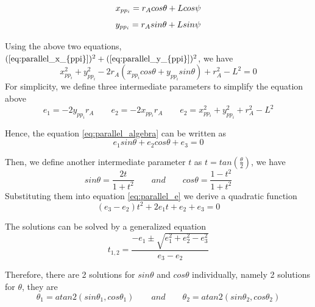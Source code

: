 \documentclass{article}
\begin{document}
\begin{equation}
\label{eq:parallel_x_{ppi}}
x_{pp_i} = r_Acos\theta+Lcos\psi
\end{equation}
\begin{equation}
\label{eq:parallel_y_{ppi}}
y_{pp_i} = r_Asin\theta+Lsin\psi
\end{equation}

Using the above two equations, $(\ref{eq:parallel_x_{ppi}})^2 + (\ref{eq:parallel_y_{ppi}})^2 $, we have
\begin{equation}
\label{eq:parallel_algebra}
x_{pp_i}^2 + y_{pp_i}^2 - 2r_A(x_{pp_i}cos\theta+y_{pp_i}sin\theta)+r_A^2-L^2 = 0
\end{equation}
For simplicity, we define three intermediate parameters to simplify the equation above
\begin{equation}
e_1 = -2y_{pp_i}r_A
\qquad
e_2 = -2x_{pp_i}r_A
\qquad
e_2 =x_{pp_i}^2+y_{pp_i}^2+r_A^2-L^2
\end{equation}

Hence, the equation \ref{eq:parallel_algebra} can be written as
\begin{equation}
\label{eq:parallel_e}
e_1sin\theta + e_2cos\theta + e_3 = 0
\end{equation}

Then, we define another intermediate parameter $t$ as $t=tan(\frac{\theta}{2})$, we have
\begin{equation}
sin\theta=\frac{2t}{1+t^2}\qquad and \qquad cos\theta=\frac{1-t^2}{1+t^2}
\end{equation}
Substituting them into equation \ref{eq:parallel_e} we derive a quadratic function 
\begin{equation}
(e_3-e_2)t^2+2e_1t+e_2+e_3=0
\end{equation}

The solutions can be solved by a generalized equation
\begin{equation}
\label{eq:parallel_t}
t_{1,2}=\frac{-e_1\pm\sqrt{e_1^2+e_2^2-e_3^2}}{e_3-e_2}
\end{equation}

Therefore, there are 2 solutions for $sin\theta$ and $cos\theta$ individually, namely 2 solutions for $\theta$, they are
\begin{equation}
\theta_1 = atan2(sin\theta_1,cos\theta_1)\qquad and \qquad \theta_2 = atan2(sin\theta_2,cos\theta_2)
\end{equation}
\end{document}
